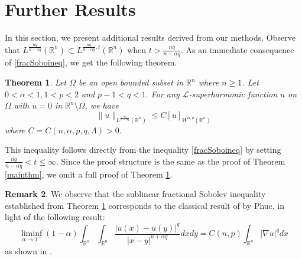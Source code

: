 \documentclass[12pt]{amsart}
\newcommand{\R}{\mathbb{R}}
\numberwithin{equation}{section}
\theoremstyle{plain}
\newtheorem{Thm}{Theorem}[section]
\theoremstyle{definition}
\newtheorem{Rem}[Thm]{Remark}
\theoremstyle{remark}
\begin{document}
\section{Further Results}\label{sec4}
In this section, we present additional results derived from our methods.
Observe that $L^{\frac{nq}{n-\alpha q}}(\R^{n})\subset L^{\frac{nq}{n-\alpha q},t}(\R^{n})$ when $t>\frac{nq}{n-\alpha q}$. As an immediate consequence of \eqref{fracSoboineq}, we get the following theorem. 
\begin{Thm}\label{mainthm2}
Let $\Omega$ be an open bounded subset in $\R^{n}$ where $n\geq 1$. Let $0<\alpha<1, 1<p<2$ and $p-1<q<1.$ For any $\mathcal{L}$-superharmonic function $u$ on $\Omega$ with $u=0$ in $\R^{n}\setminus\Omega$, we have
\[
\|u\|_{L^{\frac{nq}{n-\alpha q}}(\R^{n})} \leq C [u]_{W^{\alpha,q}(\R^{n})}
\]
where $C=C(n,\alpha,p,q,\Lambda)>0.$
\end{Thm}
This inequality follows directly from the inequality \eqref{fracSoboineq} by setting $\frac{nq}{n-\alpha q}<t\leq \infty$. Since the proof structure is the same as the proof of Theorem \ref{mainthm}, we omit a full proof of Theorem \ref{mainthm2}.

\begin{Rem}
We observe that the sublinear fractional Sobolev inequality established from Theorem \ref{mainthm2} corresponds to the classical result of \cite{Ph1} by Phuc, in light of the following result:
\[
\liminf\limits_{\alpha\to 1^{-}}(1-\alpha)\int_{\R^{n}}\int_{\R^{n}}\frac{|u(x)-u(y)|^{q}}{|x-y|^{n+\alpha q}}dxdy=C(n,p)\int_{\R^{n}}|\nabla u|^{q}dx 
\]
as shown in \cite[Theorem 7.39]{Le}.
\end{Rem}
\end{document}
